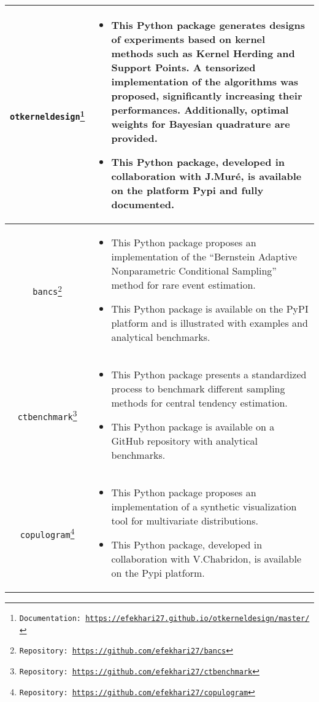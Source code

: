 \begin{center}
\footnotesize
\begin{tabularx}{\textwidth}{c >{\raggedleft\arraybackslash}X}
    \texttt{otkerneldesign\footnote{Documentation: \url{https://efekhari27.github.io/otkerneldesign/master/}}}
    &    
    \begin{itemize}[left=0pt]
        \item This Python package generates designs of experiments based on kernel methods such as Kernel Herding and Support Points. 
        A tensorized implementation of the algorithms was proposed, significantly increasing their performances. 
        Additionally, optimal weights for Bayesian quadrature are provided. 
        \item This Python package, developed in collaboration with J.Muré, is available on the platform Pypi and fully documented.
    \end{itemize}\\ \hline
    \texttt{bancs\footnote{Repository: \url{https://github.com/efekhari27/bancs}}} &    
    \begin{itemize}[left=0pt]
        \item This Python package proposes an implementation of the ``Bernstein Adaptive Nonparametric Conditional Sampling'' method for rare event estimation. 
        \item This Python package is available on the PyPI platform and is illustrated with examples and analytical benchmarks.
    \end{itemize}\\ \hline
    \texttt{ctbenchmark\footnote{Repository: \url{https://github.com/efekhari27/ctbenchmark}}} &    
    \begin{itemize}[left=0pt]
        \item This Python package presents a standardized process to benchmark different sampling methods for central tendency estimation. 
        \item This Python package is available on a GitHub repository with analytical benchmarks.
    \end{itemize}\\ \hline
    \texttt{copulogram\footnote{Repository: \url{https://github.com/efekhari27/copulogram}}} &    
    \begin{itemize}[left=0pt]
        \item This Python package proposes an implementation of a synthetic visualization tool for multivariate distributions. 
        \item This Python package, developed in collaboration with V.Chabridon, is available on the Pypi platform.
    \end{itemize}\\
\end{tabularx} 
\end{center}



